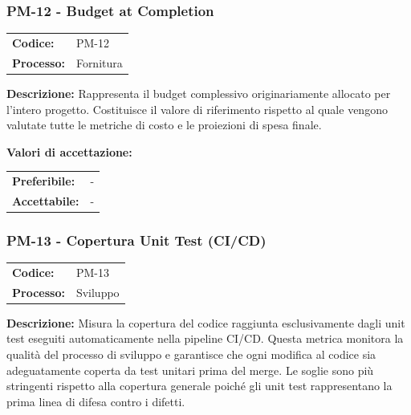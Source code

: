 \documentclass[a4paper,11pt,oneside]{scrartcl}
\begin{document}
\subsubsection{PM-12 - Budget at Completion}

\noindent
\begin{tabular}{@{}p{}p{}@{}}
    \textbf{Codice:}   & PM-12     \\
    \textbf{Processo:} & Fornitura \\
\end{tabular}

\vspace{0.3cm}
\noindent\textbf{Descrizione:} Rappresenta il budget complessivo originariamente allocato per l'intero progetto. Costituisce il valore di riferimento rispetto al quale vengono valutate tutte le metriche di costo e le proiezioni di spesa finale.

\vspace{0.2cm}
\noindent\textbf{Valori di accettazione:}
\vspace{0.1cm}

\noindent
\begin{tabular}{@{}ll@{}}
    \textbf{Preferibile:} & - \\
    \textbf{Accettabile:} & - \\
\end{tabular}

\subsubsection{PM-13 - Copertura Unit Test (CI/CD)}

\noindent
\begin{tabular}{@{}p{}p{}@{}}
    \textbf{Codice:}   & PM-13    \\
    \textbf{Processo:} & Sviluppo \\
\end{tabular}

\vspace{0.3cm}
\noindent\textbf{Descrizione:} Misura la copertura del codice raggiunta esclusivamente dagli unit test{\scriptsize{}} eseguiti automaticamente nella pipeline{\scriptsize{}} CI/CD{\scriptsize{}}. Questa metrica monitora la qualità del processo di sviluppo e garantisce che ogni modifica al codice sia adeguatamente coperta da test unitari prima del merge. Le soglie sono più stringenti rispetto alla copertura generale poiché gli unit test rappresentano la prima linea di difesa contro i difetti.
\end{document}
